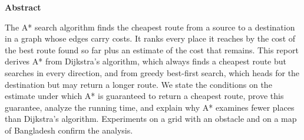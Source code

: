 \begin{center}
  {\large\bfseries Abstract}
\end{center}
\vspace{4pt}

\noindent
The A* search algorithm finds the cheapest route from a source to a destination
in a graph whose edges carry costs. It ranks every place it reaches by the cost
of the best route found so far plus an estimate of the cost that remains. This
report derives A* from Dijkstra's algorithm, which always finds a cheapest route
but searches in every direction, and from greedy best-first search, which heads
for the destination but may return a longer route. We state the conditions on
the estimate under which A* is guaranteed to return a cheapest route, prove this
guarantee, analyze the running time, and explain why A* examines fewer places
than Dijkstra's algorithm. Experiments on a grid with an obstacle and on a map
of Bangladesh confirm the analysis.
